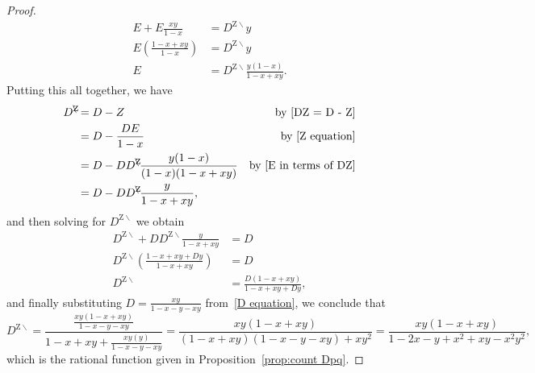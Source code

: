 \documentclass[noamsfonts,10pt]{amsart}
\newcommand{\1}{\mathbf{1}}
\theoremstyle{plain}
\theoremstyle{definition}
\numberwithin{equation}{section}
\begin{document}
\begin{proof}
\begin{align}
        E + E \frac{xy}{1-x} & = D^{\mathrm{Z} \!\!\!\! \backslash}y \nonumber \\
        E \left(\frac{1-x+xy}{1-x} \right) &= D^{\mathrm{Z} \!\!\!\! \backslash}y \nonumber \\
        E &= D^{\mathrm{Z} \!\!\!\! \backslash} \frac{y(1-x)}{1 - x + xy}. \label{E in terms of DZ}
    \end{align}
    Putting this all together, we have
    \begin{align*}
        D^{\mathrm{Z} \!\!\!\! \backslash} & = D - Z & \text{by~\eqref{DZ = D - Z}} \\
        & = D - \frac{DE}{1-x} & \text{by~\eqref{Z equation}} \\
        & = D - DD^{\mathrm{Z} \!\!\!\! \backslash} \frac{y(1-x)}{(1-x)(1-x+xy)} & \text{by~\eqref{E in terms of DZ}} \\
        & = D - DD^{\mathrm{Z} \!\!\!\! \backslash} \frac{y}{1 - x + xy},
    \end{align*}
    and then solving for $D^{\mathrm{Z} \!\!\!\! \backslash}$ we obtain
    \begin{align*}
        D^{\mathrm{Z} \!\!\!\! \backslash} + DD^{\mathrm{Z} \!\!\!\! \backslash} \frac{y}{1-x+xy} &= D \\
        D^{\mathrm{Z} \!\!\!\! \backslash} \left(\frac{1 - x + xy + Dy}{1-x+xy} \right) & = D \\
        D^{\mathrm{Z} \!\!\!\! \backslash} &= \frac{D(1-x+xy)}{1 - x + xy + Dy},
    \end{align*}
    and finally substituting $D = \frac{xy}{1 -x -y -xy}$ from~\eqref{D equation}, we conclude that
    \[
        D^{\mathrm{Z} \!\!\!\! \backslash} = \frac{\frac{xy(1 - x + xy)}{1-x-y-xy}}{1 - x + xy + \frac{xy(y)}{1-x-y-xy}} = \frac{xy(1 - x + xy)}{(1-x+xy)(1-x-y-xy) + xy^2} = \frac{xy(1 - x + xy)}{1 - 2x - y + x^2 + xy - x^2 y^2},
    \]
    which is the rational function given in Proposition~\ref{prop:count Dpq}.
\end{proof}
\end{document}
